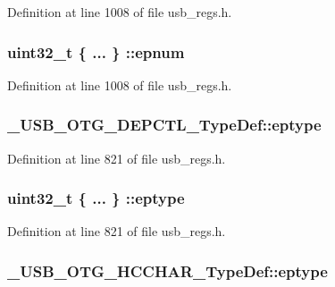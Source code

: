 Definition at line 1008 of file usb\-\_\-regs.\-h.

\hypertarget{group___u_s_b___o_t_g___d_r_i_v_e_r_ga36f0f2b6de9708754d479787c4e777db}{
\subsubsection[{epnum}]{\setlength{\rightskip}{0pt plus 5cm}uint32\-\_\-t \{ ... \} \-::epnum}}\label{group___u_s_b___o_t_g___d_r_i_v_e_r_ga36f0f2b6de9708754d479787c4e777db}


Definition at line 1008 of file usb\-\_\-regs.\-h.

\hypertarget{group___u_s_b___o_t_g___d_r_i_v_e_r_ga9d1e5bf3f406fb64d10b7a54a4302dcc}{
\subsubsection[{eptype}]{ \-\_\-\-U\-S\-B\-\_\-\-O\-T\-G\-\_\-\-D\-E\-P\-C\-T\-L\-\_\-\-Type\-Def\-::eptype}}\label{group___u_s_b___o_t_g___d_r_i_v_e_r_ga9d1e5bf3f406fb64d10b7a54a4302dcc}


Definition at line 821 of file usb\-\_\-regs.\-h.

\hypertarget{group___u_s_b___o_t_g___d_r_i_v_e_r_ga0d1e54c5e6f823f9f86d5053dbd13885}{
\subsubsection[{eptype}]{\setlength{\rightskip}{0pt plus 5cm}uint32\-\_\-t \{ ... \} \-::eptype}}\label{group___u_s_b___o_t_g___d_r_i_v_e_r_ga0d1e54c5e6f823f9f86d5053dbd13885}


Definition at line 821 of file usb\-\_\-regs.\-h.

\hypertarget{group___u_s_b___o_t_g___d_r_i_v_e_r_gabe6638f1fbc9a10f9f2281165abdf5f9}{
\subsubsection[{eptype}]{ \-\_\-\-U\-S\-B\-\_\-\-O\-T\-G\-\_\-\-H\-C\-C\-H\-A\-R\-\_\-\-Type\-Def\-::eptype}}\label{group___u_s_b___o_t_g___d_r_i_v_e_r_gabe6638f1fbc9a10f9f2281165abdf5f9}


